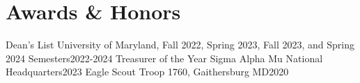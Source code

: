 \section{Awards \& Honors}
\resumeSubHeadingListStart
\resumeSubheading
{Dean's List}{}
{University of Maryland, Fall 2022, Spring 2023, Fall 2023, and
Spring 2024 Semesters}{2022-2024}
\resumeSubheading
{Treasurer of the Year}{}
{Sigma Alpha Mu National Headquarters}{2023}
\resumeSubheading
{Eagle Scout}{}
{Troop 1760, Gaithersburg MD}{2020}
\resumeSubHeadingListEnd
